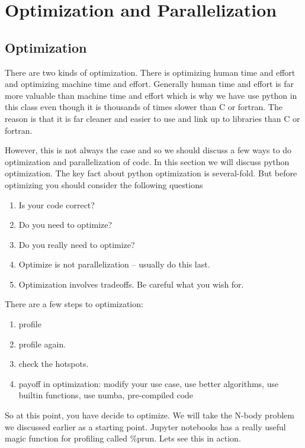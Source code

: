 \section{Optimization and Parallelization}

\subsection{Optimization}

There are two kinds of optimization.  There is optimizing human time and effort and optimizing machine time and effort.  Generally human time and effort is far more valuable than machine time and effort which is why we have use python in this class even though it is thousands of times slower than C or fortran.  The reason is that it is far cleaner and easier to use and link up to libraries than C or fortran.  

However, this is not always the case and so we should discuss a few ways to do optimization and parallelization of code. In this section we will discuss python optimization.  The key fact about python optimization is several-fold.  But before optimizing you should consider the following questions
\begin{enumerate}
    \item Is your code correct?
    \item Do you need to optimize?
    \item Do you really need to optimize?
    \item Optimize is not parallelization -- usually do this last.
    \item Optimization involves tradeoffs.  Be careful what you wish for.
\end{enumerate}

There are a few steps to optimization:
\begin{enumerate}
\item profile
\item profile again.
\item check the hotspots.
\item payoff in optimization: modify your use case, use better algorithms, use builtin functions, use numba, pre-compiled code
\end{enumerate}

So at this point, you have decide to optimize.  We will take the N-body problem we discussed earlier as a starting point. Jupyter notebooks has a really useful magic function for profiling called \%prun.  Lets see this in action.

